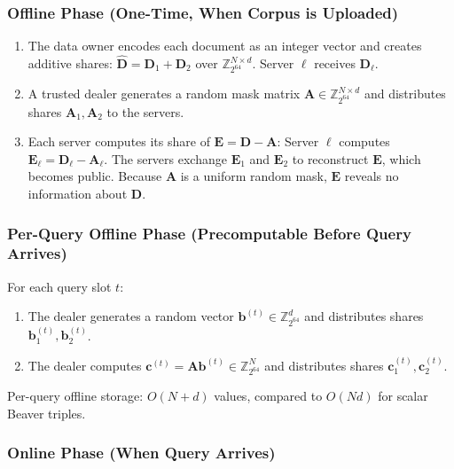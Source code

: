 \documentclass[11pt]{article}
\newcommand{\Z}{\mathbb{Z}}
\begin{document}
\subsubsection{Offline Phase (One-Time, When Corpus is Uploaded)}

\begin{enumerate}[leftmargin=*]
\item The data owner encodes each document as an integer vector and creates additive shares: $\hat{\mathbf{D}} = \mathbf{D}_1 + \mathbf{D}_2$ over $\Z_{2^{64}}^{N \times d}$. Server $\ell$ receives $\mathbf{D}_\ell$.

\item A trusted dealer generates a random mask matrix $\mathbf{A} \in \Z_{2^{64}}^{N \times d}$ and distributes shares $\mathbf{A}_1, \mathbf{A}_2$ to the servers.

\item Each server computes its share of $\mathbf{E} = \mathbf{D} - \mathbf{A}$: Server $\ell$ computes $\mathbf{E}_\ell = \mathbf{D}_\ell - \mathbf{A}_\ell$. The servers exchange $\mathbf{E}_1$ and $\mathbf{E}_2$ to reconstruct $\mathbf{E}$, which becomes public. Because $\mathbf{A}$ is a uniform random mask, $\mathbf{E}$ reveals no information about $\mathbf{D}$.
\end{enumerate}

\subsubsection{Per-Query Offline Phase (Precomputable Before Query Arrives)}

For each query slot $t$:
\begin{enumerate}[leftmargin=*]
\item The dealer generates a random vector $\mathbf{b}^{(t)} \in \Z_{2^{64}}^d$ and distributes shares $\mathbf{b}_1^{(t)}, \mathbf{b}_2^{(t)}$.

\item The dealer computes $\mathbf{c}^{(t)} = \mathbf{A} \mathbf{b}^{(t)} \in \Z_{2^{64}}^N$ and distributes shares $\mathbf{c}_1^{(t)}, \mathbf{c}_2^{(t)}$.
\end{enumerate}

Per-query offline storage: $O(N + d)$ values, compared to $O(Nd)$ for scalar Beaver triples.

\subsubsection{Online Phase (When Query Arrives)}
\end{document}
